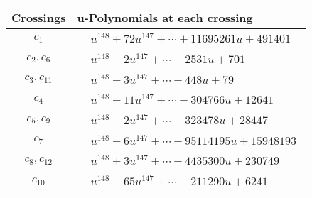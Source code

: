 \documentclass[1p]{elsarticle_modified}
\theoremstyle{definition}
\begin{document}
\begin{tabular}{m{50pt}|m{274pt}}
Crossings & \hspace{64pt}u-Polynomials at each crossing \\
\hline $$\begin{aligned}c_{1}\end{aligned}$$&$\begin{aligned}
&u^{148}+72 u^{147}+\cdots+11695261 u+491401
\end{aligned}$\\
\hline $$\begin{aligned}c_{2},c_{6}\end{aligned}$$&$\begin{aligned}
&u^{148}-2 u^{147}+\cdots-2531 u+701
\end{aligned}$\\
\hline $$\begin{aligned}c_{3},c_{11}\end{aligned}$$&$\begin{aligned}
&u^{148}-3 u^{147}+\cdots+448 u+79
\end{aligned}$\\
\hline $$\begin{aligned}c_{4}\end{aligned}$$&$\begin{aligned}
&u^{148}-11 u^{147}+\cdots-304766 u+12641
\end{aligned}$\\
\hline $$\begin{aligned}c_{5},c_{9}\end{aligned}$$&$\begin{aligned}
&u^{148}-2 u^{147}+\cdots+323478 u+28447
\end{aligned}$\\
\hline $$\begin{aligned}c_{7}\end{aligned}$$&$\begin{aligned}
&u^{148}-6 u^{147}+\cdots-95114195 u+15948193
\end{aligned}$\\
\hline $$\begin{aligned}c_{8},c_{12}\end{aligned}$$&$\begin{aligned}
&u^{148}+3 u^{147}+\cdots-4435300 u+230749
\end{aligned}$\\
\hline $$\begin{aligned}c_{10}\end{aligned}$$&$\begin{aligned}
&u^{148}-65 u^{147}+\cdots-211290 u+6241
\end{aligned}$\\
\hline
\end{tabular}\\~\\
\end{document}
